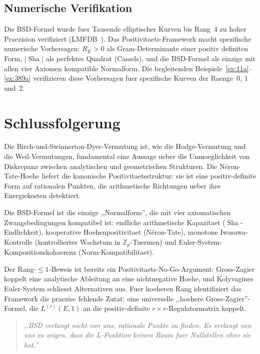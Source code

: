 \documentclass[aps,prd,twocolumn,superscriptaddress,nofootinbib]{revtex4-2}
\theoremstyle{definition}
\theoremstyle{remark}
\DeclareMathOperator{\Sha}{Sha}
\begin{document}
\subsection{Numerische Verifikation}
\label{sec:numerical}

Die BSD-Formel wurde fuer Tausende elliptischer Kurven bis Rang~4 zu hoher Praezision verifiziert (LMFDB~\cite{LMFDB}). Das Positivitaets-Framework macht spezifische numerische Vorhersagen: $R_E > 0$ als Gram-Determinante einer positiv definiten Form, $|\Sha|$ als perfektes Quadrat (Cassels), und die BSD-Formel als einzige mit allen vier Axiomen kompatible Normalform. Die begleitenden Beispiele~\ref{ex:11a}--\ref{ex:389a} verifizieren diese Vorhersagen fuer spezifische Kurven der Raenge~0, 1 und~2.

\section{Schlussfolgerung}
\label{sec:conclusion}

Die Birch-und-Swinnerton-Dyer-Vermutung ist, wie die Hodge-Vermutung und die Weil-Vermutungen, fundamental eine Aussage ueber die Unmoeglichkeit von Diskrepanz zwischen analytischen und geometrischen Strukturen. Die N\'eron-Tate-Hoehe liefert die kanonische Positivitaetsstruktur: sie ist eine positiv-definite Form auf rationalen Punkten, die arithmetische Richtungen ueber ihre Energiekosten detektiert.

Die BSD-Formel ist die einzige ,,Normalform'', die mit vier axiomatischen Zwangsbedingungen kompatibel ist: endliche arithmetische Kapazitaet ($\Sha$-Endlichkeit), kooperative Hoehenpositivitaet (N\'eron-Tate), monotone Iwasawa-Kontrolle (kontrolliertes Wachstum in $\mathbb{Z}_p$-Tuermen) und Euler-System-Kompositionskohaerenz (Norm-Kompatibilitaet).

Der Rang-$\leq 1$-Beweis ist bereits ein Positivitaets-No-Go-Argument: Gross-Zagier koppelt eine analytische Ableitung an eine nichtnegative Hoehe, und Kolyvagines Euler-System schliesst Alternativen aus. Fuer hoeheren Rang identifiziert das Framework die praezise fehlende Zutat: eine universelle ,,hoehere Gross-Zagier''-Formel, die $L^{(r)}(E,1)$ an die positiv-definite $r \times r$-Regulatormatrix koppelt.

\begin{quote}
\textit{,,BSD verlangt nicht von uns, rationale Punkte zu finden. Es verlangt von uns zu zeigen, dass die $L$-Funktion keinen Raum fuer Nullstellen ohne sie hat.''}
\end{quote}
\end{document}
